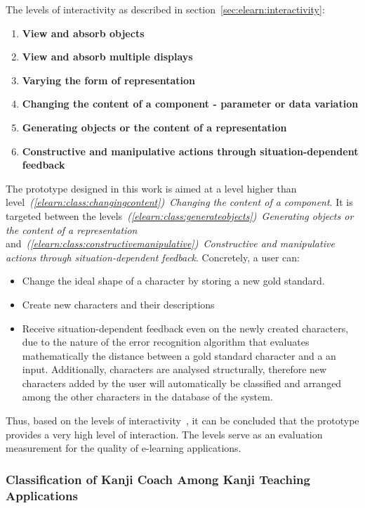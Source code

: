 \noindent The levels of interactivity as described in 
section~\ref{sec:elearn:interactivity}:
\begin{enumerate}
\item \textbf{View and absorb objects} 
\item \textbf{View and absorb multiple displays} 
\item \textbf{Varying the form of representation} 
\item \textbf{Changing the content of a component - parameter or data variation}
\item \textbf{Generating objects or the content of a representation} 
\item \textbf{Constructive and manipulative actions through situation-dependent feedback}
\end{enumerate}
The prototype designed in this work is aimed at a level higher than 
level~\emph{(\ref{elearn:class:changingcontent})~Changing the content of a 
component}. It is targeted between the 
levels~\emph{(\ref{elearn:class:generateobjects})~Generating objects or 
the content of a representation} 
and~\emph{(\ref{elearn:class:constructivemanipulative})~Constructive and 
manipulative actions through situation-dependent feedback}.
Concretely, a user can:
\begin{itemize}
 \item Change the ideal shape of a character by storing a new gold standard.
 \item Create new characters and their descriptions
 \item Receive situation-dependent feedback even on the newly created characters,
       due to the nature of the error recognition algorithm that evaluates
       mathematically the distance between a gold standard character and
       a an input.
       Additionally, characters are analysed structurally, therefore new 
       characters added by the user will automatically be classified and arranged
       among the other characters in the database of the system.
\end{itemize}
Thus, based on the levels of interactivity~,
it can be concluded that the prototype provides a very high level of 
interaction. The levels serve as an evaluation measurement for the quality of 
e-learning applications.

\subsubsection[Classification of Kanji Coach]
{Classification of Kanji Coach Among Kanji Teaching Applications}
\label{sec:concept:classificationofkanjicoach}


